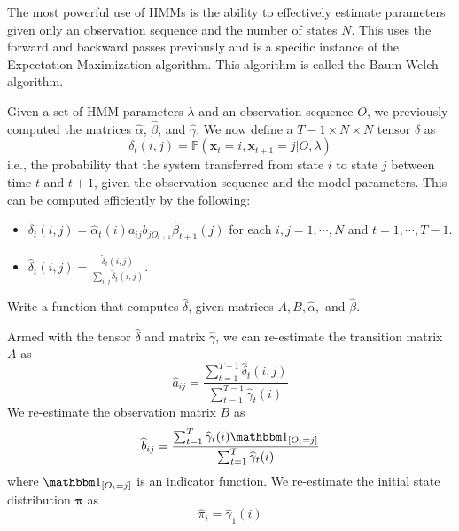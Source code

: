 

The most powerful use of HMMs is the ability to effectively estimate parameters given only an observation sequence and the number of states $N$. This uses the forward and backward passes previously and is a specific instance of the Expectation-Maximization algorithm. This algorithm is called the Baum-Welch algorithm.

Given a set of HMM parameters $\lambda$ and an observation sequence $O$, we previously computed the matrices $\widehat{\alpha}$, $\widehat{\beta}$, and $\widehat{\gamma}$. We now define a $T-1 \times N \times N$ tensor $\delta$ as 
\begin{equation*}
\delta_{t}(i,j) = \mathbb{P}(\mathbf{x}_{t} = i, \mathbf{x}_{t+1} = j | O, \lambda)
\end{equation*}
i.e., the probability that the system transferred from state $i$ to state $j$ between time $t$ and $t+1$, given the observation sequence and the model parameters. This can be computed efficiently by the following:
\begin{itemize}
 \item $\tilde{\delta}_{t}(i,j) = \widehat{\alpha}_{t}(i)a_{ij} b_{jO_{t+1}} \widehat{\beta}_{t+1}(j)$ for each $i,j = 1, \cdots, N$ and $t = 1, \cdots, T-1$.
 \item $\widehat{\delta}_{t}(i,j) = \frac{\tilde{\delta}_{t}(i,j)}{\sum_{i,j} \tilde{\delta}_{t}(i,j)}$.
\end{itemize}

\begin{problem}
Write a function that computes $\widehat{\delta}$, given matrices $A, B, \widehat{\alpha},$ and $\widehat{\beta}$.
\end{problem}

Armed with the tensor $\widehat{\delta}$ and matrix $\widehat{\gamma}$, we can re-estimate the transition matrix $A$ as
\begin{equation*}
\widehat{a}_{ij} = \frac{\sum_{t=1}^{T-1}\widehat{\delta}_{t}(i,j)}{\sum_{t=1}^{T-1}\widehat{\gamma}_{t}(i)}
\end{equation*}
We re-estimate the observation matrix $B$ as 
\begin{equation*}
\widehat{b}_{ij} = 
\frac{\sum_{t=1}^{T} \widehat{\gamma}_{t}(i) \indicator{O_{t} = j}}
{\sum_{t=1}^{T} \widehat{\gamma}_{t}(i)}
\end{equation*}
where $\indicator{O_{t} = j}$ is an indicator function. We re-estimate the initial state distribution $\mathbf{\pi}$ as 
\begin{equation*}
\widehat{\pi}_{i} = \widehat{\gamma}_{1}(i)
\end{equation*}

